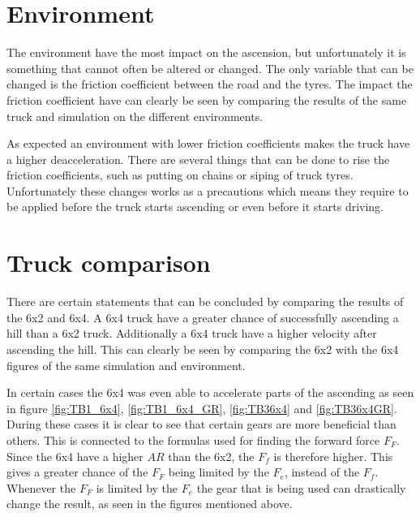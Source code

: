 \documentclass[noprint]{uit-thesis}
\begin{document}
\section{Environment}
The environment have the most impact on the ascension, but unfortunately it is something that cannot often be altered or changed. The only variable that can be changed is the friction coefficient between the road and the tyres. The impact the friction coefficient have can clearly be seen by comparing the results of the same truck and simulation on the different environments. 
\par
As expected an environment with lower friction coefficients makes the truck have a higher deacceleration. There are several things that can be done to rise the friction coefficients, such as putting on chains or siping of truck tyres. Unfortunately these changes works as a precautions which means they require to be applied before the truck starts ascending or even before it starts driving.

\section{Truck comparison}
There are certain statements that can be concluded by comparing the results of the 6x2 and 6x4. A 6x4 truck have a greater chance of successfully ascending a hill than a 6x2 truck. Additionally a 6x4 truck have a higher velocity after ascending the hill. This can clearly be seen by comparing the 6x2 with the 6x4 figures of the same simulation and environment. 
\par
In certain cases the 6x4 was even able to accelerate parts of the ascending as seen in figure \ref{fig:TB1_6x4}, \ref{fig:TB1_6x4_GR}, \ref{fig:TB36x4} and \ref{fig:TB36x4GR}. During these cases it is clear to see that certain gears are more beneficial than others. This is connected to the formulas used for finding the forward force $F_F$. Since the 6x4 have a higher $AR$ than the 6x2, the $F_f$ is therefore higher. This gives a greater chance of the $F_F$ being limited by the $F_e$, instead of the $F_f$. Whenever the $F_F$ is limited by the $F_e$ the gear that is being used can drastically change the result, as seen in the figures mentioned above.
\end{document}
